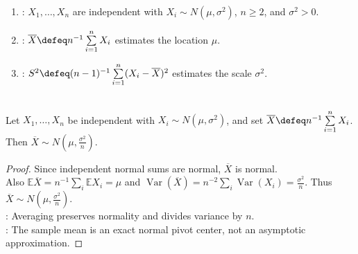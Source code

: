 \begin{definition} \label{def:normal-sample-mean-variance} 
\begin{enumerate}[label=(\roman*)]
\setlength{\itemsep}{0pt}
\item {}: $X_1,\ldots,X_n$ are independent with $X_i\sim N(\mu,\sigma^2)$, $n\geq2$, and $\sigma^2>0$.
\item {}: $\overline{X}\defeq n^{-1}\sum\limits_{i=1}^nX_i$ estimates the location $\mu$.
\item {}: $S^2\defeq(n-1)^{-1}\sum\limits_{i=1}^n(X_i-\overline{X})^2$ estimates the scale $\sigma^2$.
\end{enumerate}
\end{definition}

\begin{proposition} \label{prop:normal-sample-mean-law} \\
Let $X_1,\ldots,X_n$ be independent with $X_i\sim N(\mu,\sigma^2)$, and set $\overline{X}\defeq n^{-1}\sum\limits_{i=1}^nX_i$. Then $\overline{X}\sim N(\mu,\frac{\sigma^2}{n})$.
\begin{proof} Since independent normal sums are normal, $\overline{X}$ is normal.\\
Also $\mathbb{E}\overline{X}=n^{-1}\sum\limits_i\mathbb{E}X_i=\mu$ and $\operatorname{Var}(\overline{X})=n^{-2}\sum\limits_i\operatorname{Var}(X_i)=\frac{\sigma^2}{n}$. Thus $\overline{X}\sim N(\mu,\frac{\sigma^2}{n})$.\\
: Averaging preserves normality and divides variance by $n$.\\
: The sample mean is an exact normal pivot center, not an asymptotic approximation.
\end{proof}
\end{proposition}

